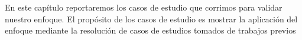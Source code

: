 En este capítulo reportaremos los casos de estudio que corrimos para validar nuestro enfoque. El propósito de los casos
de estudio es mostrar la aplicación del enfoque mediante la resolución de casos de estudios tomados de trabajos previos

